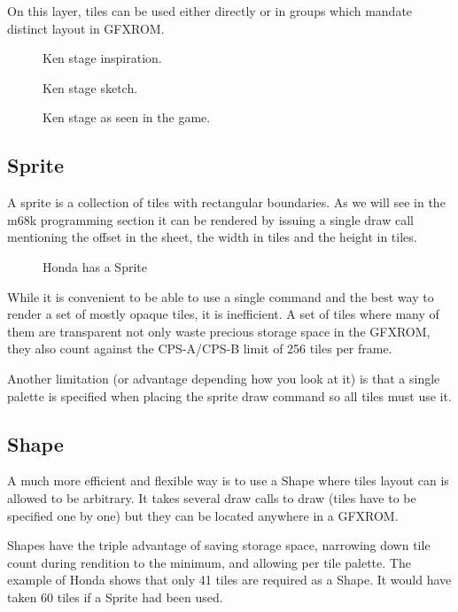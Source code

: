 On this layer, tiles can be used either directly or in groups which mandate distinct layout in GFXROM.

\begin{figure}[H]
\caption*{Ken stage inspiration.}
\end{figure}

\begin{figure}[H]
\caption*{Ken stage sketch\cite{sf2completefiles}.}
\end{figure}

\begin{figure}[H]
\caption*{Ken stage as seen in the game.}
\end{figure}


\subsection{Sprite}
A sprite is a collection of tiles with rectangular boundaries. As we will see in the m68k programming section it can be rendered by issuing a single draw call mentioning the offset in the sheet, the width in tiles and the height in tiles.

 \begin{figure}[H]
\caption*{Honda has a Sprite}
\end{figure}

While it is convenient to be able to use a single command and the best way to render a set of mostly opaque tiles, it is inefficient. A set of tiles where many of them are transparent not only waste precious storage space in the GFXROM, they also count against the CPS-A/CPS-B limit of 256 tiles per frame.

Another limitation (or advantage depending how you look at it) is that a single palette is specified when placing the sprite draw command so all tiles must use it.

\subsection{Shape}

A much more efficient and flexible way is to use a Shape where tiles layout can is allowed to be arbitrary. It takes several draw calls to draw (tiles have to be specified one by one) but they can be located anywhere in a GFXROM.

Shapes have the triple advantage of saving storage space, narrowing down tile count during rendition to the minimum, and allowing per tile palette. The example of Honda shows that only 41 tiles are required as a Shape. It would have taken 60 tiles if a Sprite had been used.


